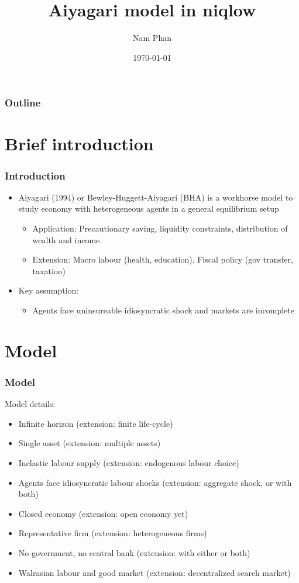 \documentclass{beamer}
\title{Aiyagari model in niqlow}
\author{Nam Phan}
\date{\today}
\begin{document}
	
	\begin{frame}
		\titlepage
	\end{frame}

\begin{frame}
\frametitle{Outline}
\tableofcontents
\end{frame}


\section{Brief introduction}

\begin{frame}
\frametitle{Introduction}
\begin{itemize}
	\item Aiyagari (1994) or Bewley-Huggett-Aiyagari (BHA) is a workhorse model to study economy with heterogeneous agents in a general equilibrium setup
	\begin{itemize}
		\item Application: Precautionary saving, liquidity constraints, distribution of wealth and income.  
		\item Extension: Macro labour (health, education). Fiscal policy (gov transfer, taxation)
		\end{itemize}
	\item Key assumption:
	\begin{itemize}
		\item Agents face uninsureable idiosyncratic shock and markets are incomplete 
	\end{itemize}
\end{itemize}

\end{frame}



\section{Model}

\begin{frame}
\frametitle{Model}
Model details:
\begin{itemize}
	\item Infinite horizon (extension: finite life-cycle)
	\item Single asset (extension: multiple assets)
	\item Inelastic labour supply (extension: endogenous labour choice)
	\item Agents face idiosyncratic labour shocks (extension: aggregate shock, or with both)
	\item Closed economy (extension: open economy yet)
	\item Representative firm (extension: heterogeneous firms)
	\item No government, no central bank (extension: with either or both)
	\item Walrasian labour and good market (extension: decentralized search market)
\end{itemize}
\end{frame}
\end{document}
